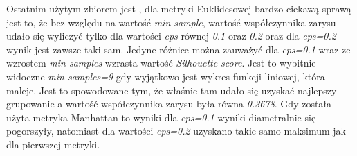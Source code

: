 \documentclass{classrep}
\begin{document}
{{            Ostatnim użytym zbiorem jest \cite{dataset_moons}, dla metryki Euklidesowej
            bardzo ciekawą sprawą jest to, że bez względu na wartość
            \textit{min sample}, wartość współczynnika zarysu udało się wyliczyć tylko
            dla wartości \textit{eps} równej \textit{0.1} oraz \textit{0.2} oraz dla
            \textit{eps=0.2} wynik jest zawsze taki sam. Jedyne różnice można zauważyć
            dla \textit{eps=0.1} wraz ze wzrostem \textit{min samples} wzrasta wartość
            \textit{Silhouette score}. Jest to wybitnie widoczne \textit{min samples=9}
            gdy wyjątkowo jest wykres funkcji liniowej, która maleje. Jest to
            spowodowane tym, że właśnie tam udało się uzyskać najlepszy grupowanie a
            wartość współczynnika zarysu była równa \textit{0.3678}. Gdy została użyta
            metryka Manhattan to wyniki dla \textit{eps=0.1} wyniki diametralnie się
            pogorszyły, natomiast dla wartości \textit{eps=0.2} uzyskano takie samo
            maksimum jak dla pierwszej metryki.
        }

    }
\end{document}
